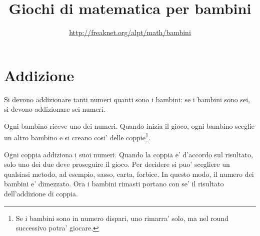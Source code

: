 \documentclass[a4paper]{article}
\begin{document}
\title{Giochi di matematica per bambini}
\author{\small{\url{http://freaknet.org/alpt/math/bambini}}
}


\maketitle{}



\clearpage
\tableofcontents
\clearpage
{}

\let\oldsection\section
\renewcommand{\section}[1]{\oldsection{#1}\ilabel{#1}}
\let\oldsubsection\subsection
\renewcommand{\subsection}[1]{\oldsubsection{#1}\ilabel{#1}}
\let\oldsubsubsection\subsubsection
\renewcommand{\subsubsection}[1]{\oldsubsubsection{#1}\ilabel{#1}}


\section{Addizione}
Si devono addizionare tanti numeri quanti sono i bambini: se i bambini sono sei, si devono addizionare sei numeri.

Ogni bambino riceve uno dei numeri. Quando inizia il gioco, ogni bambino sceglie un altro bambino e si creano cosi' delle coppie\footnote{Se i bambini sono in numero dispari, uno rimarra' solo, ma nel round successivo potra' giocare.}.

Ogni coppia addiziona i suoi numeri. Quando la coppia e' d'accordo sul risultato, solo uno dei due deve proseguire il gioco. Per decidere si puo' scegliere un qualsiasi metodo, ad esempio, sasso, carta, forbice. In questo modo, il numero dei bambini e' dimezzato. Ora i bambini rimasti portano con se' il risultato dell'addizione di coppia.
\end{document}
